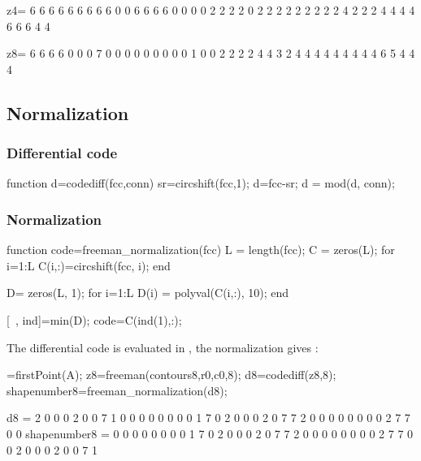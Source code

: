 \begin{mwindow}
z4= 6 6 6 6 6 6 6 6 6 0 0 6 6 6 6 0 0 0 0 2 2 2 2 0 2 2 2 2 2 2 2 2 2 4 2 2 2 4 4 4 4 6 6 6 4 4

z8= 6 6 6 6 0 0 0 7 0 0 0 0 0 0 0 0 0 1 0 0 2 2 2 2 4 4 3 2 4 4 4 4 4 4 4 4 4 6 5 4 4 4
\end{mwindow}


\subsection{Normalization}
\subsubsection{Differential code}
\begin{matlab}
function d=codediff(fcc,conn)
sr=circshift(fcc,1);
d=fcc-sr;
d = mod(d, conn);
\end{matlab}

\subsubsection{Normalization}
\begin{matlab}
function code=freeman_normalization(fcc)
L = length(fcc);
C = zeros(L);
for i=1:L
    C(i,:)=circshift(fcc, i);
end

D= zeros(L, 1);
for i=1:L
    D(i) = polyval(C(i,:), 10);
end

[~, ind]=min(D);
code=C(ind(1),:);
\end{matlab}

The differential code is evaluated in , the normalization gives :
\begin{matlab}
[r0,c0]=firstPoint(A);
z8=freeman(contours8,r0,c0,8);
d8=codediff(z8,8);
shapenumber8=freeman_normalization(d8);
\end{matlab}

\begin{mwindow}
d8 = 2 0 0 0 2 0 0 7 1 0 0 0 0 0 0 0 0 1 7 0 2 0 0 0 2 0 7 7 2 0 0 0 0 0 0 0 0 2 7 7 0 0
shapenumber8 = 0 0 0 0 0 0 0 0 1 7 0 2 0 0 0 2 0 7 7 2 0 0 0 0 0 0 0 0 2 7 7 0 0 2 0 0 0 2 0 0 7 1
\end{mwindow}

